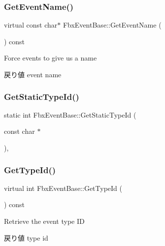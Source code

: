 \subsubsection{\texorpdfstring{Get\+Event\+Name()}{GetEventName()}}
{\footnotesize\ttfamily virtual const char$\ast$ Fbx\+Event\+Base\+::\+Get\+Event\+Name (\begin{DoxyParamCaption}{ }\end{DoxyParamCaption}) const\hspace{0.3cm}{\ttfamily [pure virtual]}}

Force events to give us a name \begin{DoxyReturn}{戻り値}
event name 
\end{DoxyReturn}
\mbox{\label{class_fbx_event_base_a57cde15f6d1c6567bc8dbafc1658bcc5}} 
\subsubsection{\texorpdfstring{Get\+Static\+Type\+Id()}{GetStaticTypeId()}}
{\footnotesize\ttfamily static int Fbx\+Event\+Base\+::\+Get\+Static\+Type\+Id (\begin{DoxyParamCaption}\item[{const char $\ast$}]{ }\end{DoxyParamCaption})\hspace{0.3cm}{\ttfamily [static]}, {\ttfamily [protected]}}

\mbox{\label{class_fbx_event_base_ac7a558ec38bc899bd705786620582b8b}} 
\subsubsection{\texorpdfstring{Get\+Type\+Id()}{GetTypeId()}}
{\footnotesize\ttfamily virtual int Fbx\+Event\+Base\+::\+Get\+Type\+Id (\begin{DoxyParamCaption}{ }\end{DoxyParamCaption}) const\hspace{0.3cm}{\ttfamily [pure virtual]}}

Retrieve the event type ID \begin{DoxyReturn}{戻り値}
type id 
\end{DoxyReturn}


